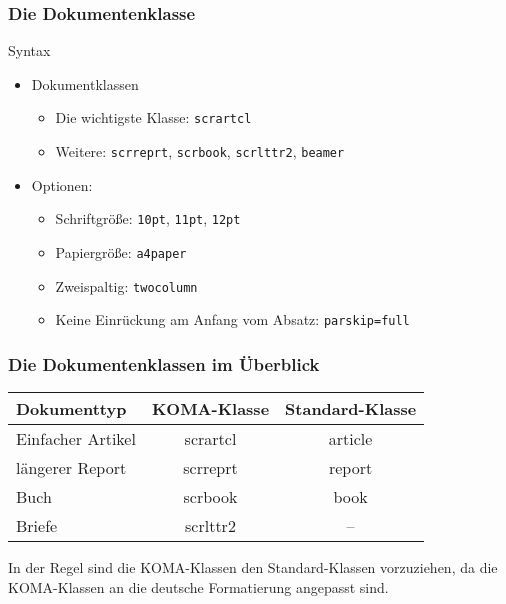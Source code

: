 \begin{frame}[fragile]
    \frametitle{Die Dokumentenklasse}
    \begin{block}{Syntax}
    \end{block}
    \pause
    \begin{itemize}
        \item Dokumentklassen
        \begin{itemize}
            \item Die wichtigste Klasse: \verb+scrartcl+\pause
            \item Weitere: \verb+scrreprt+, \verb+scrbook+, \verb+scrlttr2+, \verb+beamer+\pause
        \end{itemize}
        \item Optionen:
        \begin{itemize}
            \item Schriftgröße: \verb+10pt+, \verb+11pt+, \verb+12pt+\pause
            \item Papiergröße: \verb+a4paper+\pause
            \item Zweispaltig: \verb+twocolumn+\pause
            \item Keine Einrückung am Anfang vom Absatz: \verb+parskip=full+
        \end{itemize}
    \end{itemize}
\end{frame}


\begin{frame}
    \frametitle{Die Dokumentenklassen im Überblick}

    \begin{tabular}{l|c|c}
        Dokumenttyp & KOMA-Klasse & Standard-Klasse\\
        \hline
        Einfacher Artikel & scrartcl & article\\
        längerer Report & scrreprt & report\\
        Buch & scrbook & book\\
        Briefe & scrlttr2 & --
    \end{tabular}
    
    \bigskip
    
    In der Regel sind die KOMA-Klassen den Standard-Klassen vorzuziehen, da die KOMA-Klassen an die deutsche Formatierung angepasst sind.
\end{frame}


